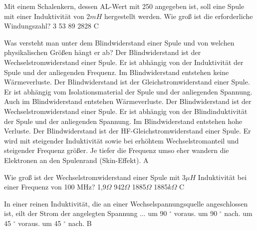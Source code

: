 {Mit einem Schalenkern, dessen AL-Wert mit 250 angegeben ist, soll eine Spule mit einer Induktivität von 2$mH$ hergestellt werden. Wie groß ist die erforderliche Windungszahl?}%
{3}%
{53}%
{89}%
{2828}%
{C}%


{Was versteht man unter dem Blindwiderstand einer Spule und von welchen physikalischen Größen hängt er ab?}%
{Der Blindwiderstand ist der Wechselstromwiderstand einer Spule. Er ist abhängig von der Induktivität der Spule und der anliegenden Frequenz. Im Blindwiderstand entstehen keine Wärmeverluste.}%
{Der Blindwiderstand ist der Gleichstromwiderstand einer Spule. Er ist abhängig vom Isolationsmaterial der Spule und der anliegenden Spannung. Auch im Blindwiderstand entstehen Wärmeverluste.}%
{Der Blindwiderstand ist der Wechselstromwiderstand einer Spule. Er ist abhängig von der Blindinduktivität der Spule und der anliegenden Spannung. Im Blindwiderstand entstehen hohe Verluste.}%
{Der Blindwiderstand ist der HF-Gleichstromwiderstand einer Spule. Er wird mit steigender Induktivität sowie bei erhöhtem Wechselstromanteil und steigender Frequenz größer. Je tiefer die Frequenz umso eher wandern die Elektronen an den Spulenrand (Skin-Effekt).}%
{A}%

{Wie groß ist der Wechselstromwiderstand einer Spule mit 3$\mu H$ Induktivität bei einer Frequenz von 100 MHz?}%
{1,9$\Omega$}%
{942$\Omega$}%
{1885$\Omega$}%
{1885$k\Omega$}%
{C}%

{In einer reinen Induktivität, die an einer Wechselspannungsquelle angeschlossen ist, eilt der Strom der angelegten Spannung ...}%
{um 90 $^\circ$ voraus.}%
{um 90 $^\circ$ nach.}%
{um 45 $^\circ$ voraus.}%
{um 45 $^\circ$ nach.}%
{B}%
